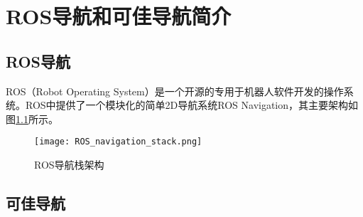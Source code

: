 
\chapter{ROS导航和可佳导航简介}

\section{ROS导航}

ROS（Robot Operating System）是一个开源的专用于机器人软件开发的操作系统。ROS中提供了一个模块化的简单2D导航系统ROS Navigation，其主要架构如图\ref{fig:rosnav}所示。

\begin{figure}[htb]
  \centering
  \texttt{[image: ROS\_navigation\_stack.png]}
  \caption{ROS导航栈架构}
  \label{fig:rosnav}
\end{figure}

\section{可佳导航}
